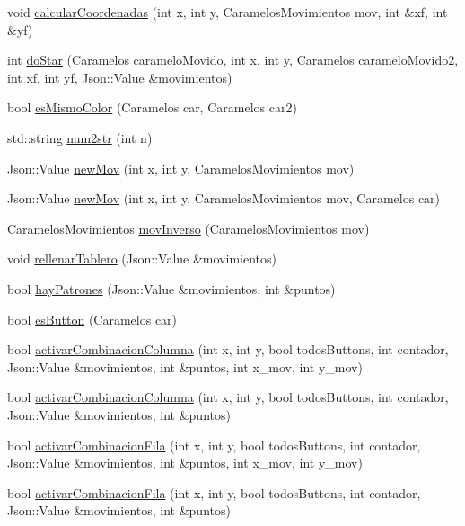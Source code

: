 \begin{DoxyCompactItemize}
\item 
void \hyperlink{classTablero_a3a700258b30b74de4087fdc73404187b}{calcular\-Coordenadas} (int x, int y, Caramelos\-Movimientos mov, int \&xf, int \&yf)
\item 
int \hyperlink{classTablero_a2622b4644514f7c5bed5a0c2cd1acd45}{do\-Star} (Caramelos caramelo\-Movido, int x, int y, Caramelos caramelo\-Movido2, int xf, int yf, Json\-::\-Value \&movimientos)
\item 
bool \hyperlink{classTablero_ae9ccd18ce28c08063fda40f16757c04f}{es\-Mismo\-Color} (Caramelos car, Caramelos car2)
\item 
std\-::string \hyperlink{classTablero_a3525fd9066b6403a8a1f9b9d9fdebae1}{num2str} (int n)
\item 
Json\-::\-Value \hyperlink{classTablero_ae97632028f95c231db57e1895512b7de}{new\-Mov} (int x, int y, Caramelos\-Movimientos mov)
\item 
Json\-::\-Value \hyperlink{classTablero_a52489c217f8e3c3c92fe2b30c974bcf3}{new\-Mov} (int x, int y, Caramelos\-Movimientos mov, Caramelos car)
\item 
Caramelos\-Movimientos \hyperlink{classTablero_a25a6e1a3be7bfc614d98315a5d19c0be}{mov\-Inverso} (Caramelos\-Movimientos mov)
\item 
void \hyperlink{classTablero_adea22d7a54a86d1f15571ce9492cfdd4}{rellenar\-Tablero} (Json\-::\-Value \&movimientos)
\item 
bool \hyperlink{classTablero_a6ad1b37f469dabc3fe092196441e3e05}{hay\-Patrones} (Json\-::\-Value \&movimientos, int \&puntos)
\item 
bool \hyperlink{classTablero_a202f74274692f28609766f0581f708eb}{es\-Button} (Caramelos car)
\item 
bool \hyperlink{classTablero_a3dee20f919de1fb404d9b637f2248584}{activar\-Combinacion\-Columna} (int x, int y, bool todos\-Buttons, int contador, Json\-::\-Value \&movimientos, int \&puntos, int x\-\_\-mov, int y\-\_\-mov)
\item 
bool \hyperlink{classTablero_a5010829869badf98a41e256f961a74a0}{activar\-Combinacion\-Columna} (int x, int y, bool todos\-Buttons, int contador, Json\-::\-Value \&movimientos, int \&puntos)
\item 
bool \hyperlink{classTablero_a0b795b193298c48038067fe4d7874727}{activar\-Combinacion\-Fila} (int x, int y, bool todos\-Buttons, int contador, Json\-::\-Value \&movimientos, int \&puntos, int x\-\_\-mov, int y\-\_\-mov)
\item 
bool \hyperlink{classTablero_a11ec8fc6053f58b0a1d01828080b1549}{activar\-Combinacion\-Fila} (int x, int y, bool todos\-Buttons, int contador, Json\-::\-Value \&movimientos, int \&puntos)

\end{DoxyCompactItemize}

